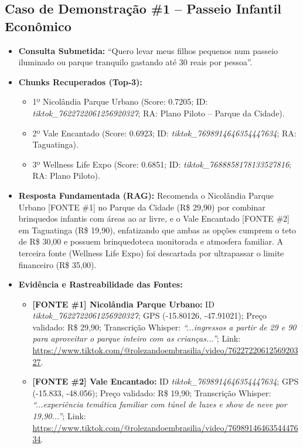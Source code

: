 \documentclass[12pt,a4paper]{article}
\begin{document}
\subsection{Caso de Demonstração \#1 -- Passeio Infantil Econômico}
\begin{itemize}[leftmargin=1.0cm]
\item \textbf{Consulta Submetida:} ``Quero levar meus filhos pequenos num passeio iluminado ou parque tranquilo gastando até 30 reais por pessoa''.
\item \textbf{Chunks Recuperados (Top-3):}
\begin{itemize}
\item 1º Nicolândia Parque Urbano (Score: 0.7205; ID: \textit{tiktok\_7622722061256920327}; RA: Plano Piloto -- Parque da Cidade).
\item 2º Vale Encantado (Score: 0.6923; ID: \textit{tiktok\_7698914646354447634}; RA: Taguatinga).
\item 3º Wellness Life Expo (Score: 0.6851; ID: \textit{tiktok\_7688858178133527816}; RA: Plano Piloto).
\end{itemize}
\item \textbf{Resposta Fundamentada (RAG):} Recomenda o Nicolândia Parque Urbano [FONTE \#1] no Parque da Cidade (R\$ 29,90) por combinar brinquedos infantis com áreas ao ar livre, e o Vale Encantado [FONTE \#2] em Taguatinga (R\$ 19,90), enfatizando que ambas as opções cumprem o teto de R\$ 30,00 e possuem brinquedoteca monitorada e atmosfera familiar. A terceira fonte (Wellness Life Expo) foi descartada por ultrapassar o limite financeiro (R\$ 35,00).
\item \textbf{Evidência e Rastreabilidade das Fontes:}
\begin{itemize}
\item \textbf{[FONTE \#1] Nicolândia Parque Urbano:} ID \textit{tiktok\_7622722061256920327}; GPS (-15.80126, -47.91021); Preço validado: R\$ 29,90; Transcrição Whisper: \textit{``...ingressos a partir de 29 e 90 para aproveitar o parque inteiro com as crianças...''}; Link: \url{https://www.tiktok.com/@rolezandoembrasilia/video/7622722061256920327}.
\item \textbf{[FONTE \#2] Vale Encantado:} ID \textit{tiktok\_7698914646354447634}; GPS (-15.833, -48.056); Preço validado: R\$ 19,90; Transcrição Whisper: \textit{``...experiência temática familiar com túnel de luzes e show de neve por 19,90...''}; Link: \url{https://www.tiktok.com/@rolezandoembrasilia/video/7698914646354447634}.
\end{itemize}
\end{itemize}
\end{document}

